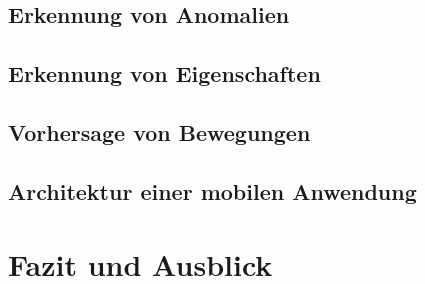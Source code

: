 \documentclass{hsflensburg}
\begin{document}
  \section{Erkennung von Anomalien}
  \section{Erkennung von Eigenschaften}
  \section{Vorhersage von Bewegungen}
  \section{Architektur einer mobilen Anwendung}

  \chapter{Fazit und Ausblick}

  \printbibliography
\end{document}
